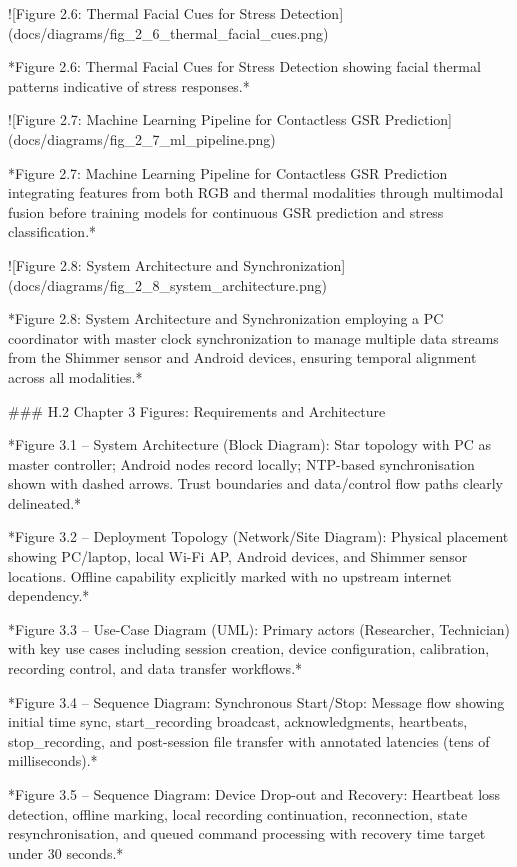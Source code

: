 \documentclass[12pt,a4paper]{article}
\begin{document}
{![Figure 2.6: Thermal Facial Cues for Stress Detection](docs/diagrams/fig_2_6_thermal_facial_cues.png)

*Figure 2.6: Thermal Facial Cues for Stress Detection showing facial thermal patterns indicative of stress responses.*

![Figure 2.7: Machine Learning Pipeline for Contactless GSR Prediction](docs/diagrams/fig_2_7_ml_pipeline.png)

*Figure 2.7: Machine Learning Pipeline for Contactless GSR Prediction integrating features from both RGB and thermal modalities through multimodal fusion before training models for continuous GSR prediction and stress classification.*

![Figure 2.8: System Architecture and Synchronization](docs/diagrams/fig_2_8_system_architecture.png)

*Figure 2.8: System Architecture and Synchronization employing a PC coordinator with master clock synchronization to manage multiple data streams from the Shimmer sensor and Android devices, ensuring temporal alignment across all modalities.*

### H.2 Chapter 3 Figures: Requirements and Architecture

*Figure 3.1 – System Architecture (Block Diagram): Star topology with PC as master controller; Android nodes record locally; NTP-based synchronisation shown with dashed arrows. Trust boundaries and data/control flow paths clearly delineated.*

*Figure 3.2 – Deployment Topology (Network/Site Diagram): Physical placement showing PC/laptop, local Wi-Fi AP, Android devices, and Shimmer sensor locations. Offline capability explicitly marked with no upstream internet dependency.*

*Figure 3.3 – Use-Case Diagram (UML): Primary actors (Researcher, Technician) with key use cases including session creation, device configuration, calibration, recording control, and data transfer workflows.*

*Figure 3.4 – Sequence Diagram: Synchronous Start/Stop: Message flow showing initial time sync, start_recording broadcast, acknowledgments, heartbeats, stop_recording, and post-session file transfer with annotated latencies (tens of milliseconds).*

*Figure 3.5 – Sequence Diagram: Device Drop-out and Recovery: Heartbeat loss detection, offline marking, local recording continuation, reconnection, state resynchronisation, and queued command processing with recovery time target under 30 seconds.*

}
\end{document}
